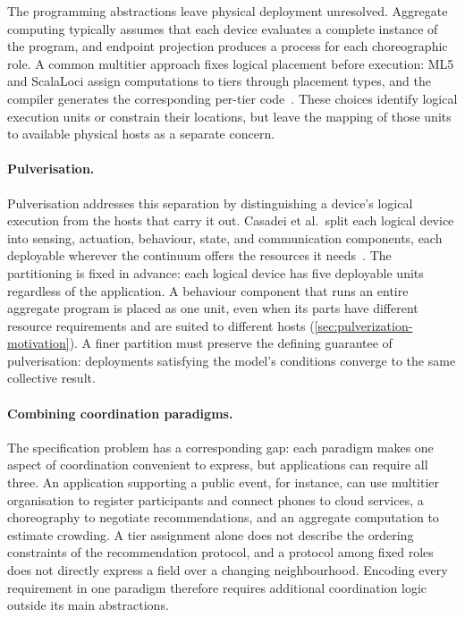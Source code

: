 The programming abstractions leave physical deployment unresolved.
Aggregate computing typically assumes that each device evaluates a complete instance of the program,
and endpoint projection produces a process for each choreographic role.
%
A common multitier approach fixes logical placement before execution:
ML5 and ScalaLoci assign computations to tiers through placement types,
and the compiler generates the corresponding per-tier code~\cite{DBLP:journals/csur/WeisenburgerWS20}.
%
These choices identify logical execution units or constrain their locations,
but leave the mapping of those units to available physical hosts as a separate concern.

\paragraph{Pulverisation.}
Pulverisation addresses this separation by distinguishing a device's logical execution from the hosts that carry it out.
%
Casadei et al.\ split each logical device into sensing, actuation, behaviour, state, and communication components,
each deployable wherever the continuum offers the resources it needs~\cite{DBLP:journals/fi/CasadeiPPVW20}.
%
The partitioning is fixed in advance:
each logical device has five deployable units regardless of the application.
%
A behaviour component that runs an entire aggregate program is placed as one unit,
even when its parts have different resource requirements and are suited to different hosts (\cref{sec:pulverization-motivation}).
%
A finer partition must preserve the defining guarantee of pulverisation:
deployments satisfying the model's conditions converge to the same collective result.

\paragraph{Combining coordination paradigms.}
The specification problem has a corresponding gap: each paradigm makes one aspect of coordination convenient to express,
but applications can require all three.
An application supporting a public event, for instance, can use multitier organisation to register participants and connect phones to cloud services,
a choreography to negotiate recommendations,
and an aggregate computation to estimate crowding.
%
A tier assignment alone does not describe the ordering constraints of the recommendation protocol,
and a protocol among fixed roles does not directly express a field over a changing neighbourhood.
Encoding every requirement in one paradigm therefore requires additional coordination logic outside its main abstractions.

